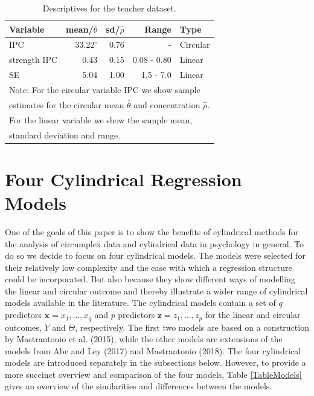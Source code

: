 \documentclass[man]{apa6}
\begin{document}
\begin{table}[h]
\centering
\caption{Descriptives for the teacher dataset.} 
\begin{tabular}{lrrrl}
  \noalign{\smallskip}\hline\noalign{\smallskip}
Variable & mean/$\bar{\theta}$ & sd/$\hat{\rho}$ & Range & Type \\ \hline\noalign{\smallskip}
IPC &33.22$^\circ$& 0.76 & - & Circular\\
strength IPC & 0.43 & 0.15 & 0.08 - 0.80 & Linear\\
SE & 5.04 & 1.00 & 1.5 - 7.0 & Linear\\
   \hline
\multicolumn{5}{l}{Note: For the circular variable IPC we show sample }\\
\multicolumn{5}{l}{estimates for the circular mean $\bar{\theta}$ and concentration $\hat{\rho}$.}\\
\multicolumn{5}{l}{For the linear variable we show the sample mean,}\\
\multicolumn{5}{l}{standard deviation and range.}
\end{tabular}
\label{Tableteacherdescriptives}
\end{table}

\section{Four Cylindrical Regression Models}\label{Models}

One of the goals of this paper is to show the benefits of cylindrical methods
for the analysis of circumplex data and cylindrical data in psychology in
general. To do so we decide to focus on four cylindrical models. The models were
selected for their relatively low complexity and the ease with which a
regression structure could be incorporated. But also because they show different
ways of modelling the linear and circular outcome and thereby illustrate a
wider range of cylindrical models available in the literature. The
cylindrical models contain a set of \(q\) predictors \(\boldsymbol{x} = x_1, \dots, x_q\) and \(p\) predictors \(\boldsymbol{z} = z_1, \dots, z_p\) for the linear and
circular outcomes, \(Y\) and \(\Theta\), respectively. The first two models are
based on a construction by Mastrantonio et al. (2015), while the other models are
extensions of the models from Abe and Ley (2017) and Mastrantonio (2018). The
four cylindrical models are introduced separately in the subsections below.
However, to provide a more succinct overview and comparison of the four models, Table
\ref{TableModels} gives an overview of the similarities and differences between
the models.
\end{document}
